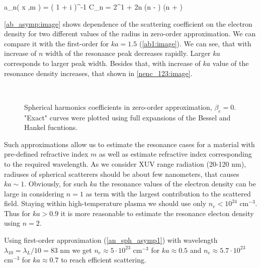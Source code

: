     \eq
		a_n\left( x ,\:m \right) = \left( 1 + i  \right)^{-1}
		\label{an_sph_asymp1}
	\qe
	\eqc
		C_n = 2^{1 + 2n} \Gamma(n - ) \Gamma(n + )
	\cqe

\autoref{ab_asymp:image} shows dependence of the scattering coefficient on the electron density for two different values of the radius in zero-order approximation. We can compare it with the first-order for $ka = 1.5$ (\autoref{ab1:image}). We can see, that with increase of $n$ width of the resonance peak decreases rapidly. Larger $ka$ corresponds to larger peak width. Besides that, with increase of $ka$ value of the resonance density increases, that shown in \autoref{nenc_123:image}.

    \begin{figure}[H]
        \\
		\caption{Spherical harmonics coefficients in zero-order approximation, $\beta_e = 0$. "Exact" curves were plotted using full expansions of the Bessel and Hankel fucntions.}
		\label{ab_asymp:image}
	\end{figure}


Such approximations allow us to estimate the resonance cases for a material with pre-defined refractive index $m$ as well as estimate refractive index corresponding to the required wavelength. As we consider XUV range radiation (20-120 nm), radiuses of spherical scatterers should be about few nanometers, that causes $ka \sim 1$. Obviously, for such $ ka $ the resonance values of the electron density can be large in considering $n = 1$ as term with the largest contribution to the scattered field. Staying within high-temperature plasma we should use only $n_e < 10^{24}$ $\textrm{cm}^{-3}$. Thus for $ka > 0.9$ it is more reasonable to estimate the resonance electon density using $n = 2$.

Using first-order approximation (\ref{an_sph_asymp1}) with wavelength $\lambda_{10} = \lambda_{L} / 10 = 83$ nm we get $n_e \approx 5 \cdot 10^{23}$ $\textrm{cm}^{-3}$ for $ka \approx 0.5$ and $n_e \approx 5.7 \cdot 10^{23}$ $\textrm{cm}^{-3}$ for $ka \approx 0.7$ to reach efficient scattering.




